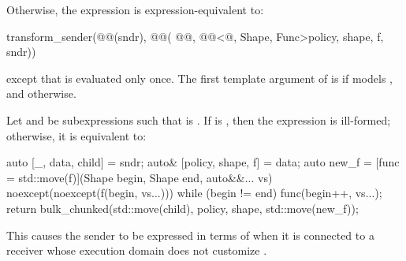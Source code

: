\pnum
Otherwise,
the expression 
is expression-equivalent to:

\begin{codeblock}
transform_sender(@@(sndr), @@(
    @@, @@<@\seebelow@, Shape, Func>{policy, shape, f}, sndr))
\end{codeblock}
except that  is evaluated only once.
The first template argument of  is 
if  models , and
 otherwise.

\pnum
Let  and  be subexpressions such that
 is .
If  is , then
the expression  is ill-formed;
otherwise, it is equivalent to:
\begin{codeblock}
auto [_, data, child] = sndr;
auto& [policy, shape, f] = data;
auto new_f = [func = std::move(f)](Shape begin, Shape end, auto&&... vs)
    noexcept(noexcept(f(begin, vs...))) {
  while (begin != end) func(begin++, vs...);
}
return bulk_chunked(std::move(child), policy, shape, std::move(new_f));
\end{codeblock}
\begin{note}
This causes the  sender to be
expressed in terms of  when
it is connected to a receiver whose
execution domain does not customize .
\end{note}

